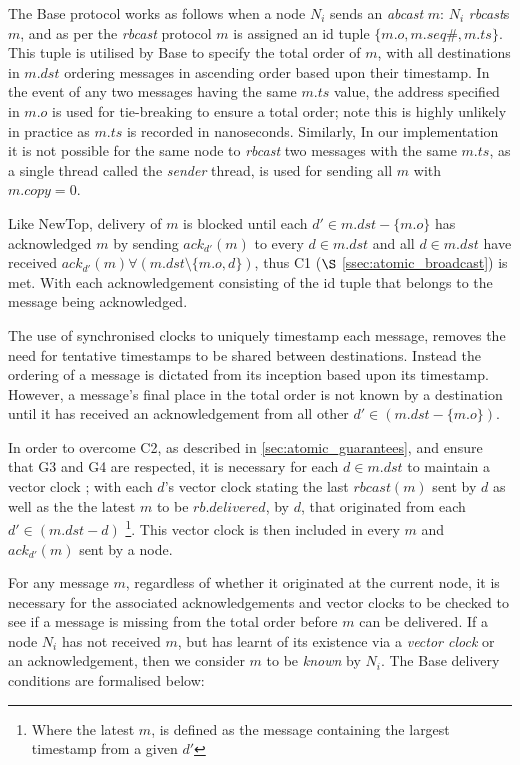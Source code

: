    The \textsf{Base} protocol works as follows when a node $N_i$ sends an \emph{abcast} $m$: $N_i$ \emph{rbcast}s $m$, and as per the \emph{rbcast} protocol $m$ is assigned an id tuple $\{m.o, m.seq\#, m.ts\}$.  This tuple is utilised by \textsf{Base} to specify the total order of $m$, with all destinations in $m.dst$ ordering messages in ascending order based upon their timestamp.  In the event of any two messages having the same $m.ts$ value, the address specified in $m.o$ is used for tie-breaking to ensure a total order; note this is highly unlikely in practice as $m.ts$ is recorded in nanoseconds.  Similarly, In our implementation it is not possible for the same node to \emph{rbcast} two messages with the same $m.ts$, as a single thread called the \emph{sender} thread, is used for sending all $m$ with $m.copy = 0$.  
    
    Like NewTop, delivery of $m$ is blocked until each $d' \in m.dst - \{m.o\}$ has acknowledged $m$ by sending $ack_{d'}(m)$ to every $d \in m.dst$ and all $d \in m.dst$ have received $ack_{d'}(m) \forall (m.dst \setminus \{m.o,d\})$, thus C1 ($\S$ \ref{ssec:atomic_broadcast}) is met.  With each acknowledgement consisting of the id tuple that belongs to the message being acknowledged.  
    
    The use of synchronised clocks to uniquely timestamp each message, removes the need for tentative timestamps to be shared between destinations.  Instead the ordering of a message is dictated from its inception based upon its timestamp.  However,  a message's final place in the total order is not known by a destination until it has received an acknowledgement from all other $d' \in (m.dst - \{m.o\})$.  
    
    In order to overcome C2, as described in \ref{sec:atomic_guarantees}, and ensure that G3 and G4 are respected, it is necessary for each $d \in m.dst$ to maintain a vector clock \citep{Mattern88virtualtime, fidge1988timestamps}; with each $d$'s vector clock stating the last $rbcast(m)$ sent by $d$ as well as the the latest $m$ to be $rb.delivered$, by $d$, that originated from each $d' \in (m.dst - d)$ \footnote{Where the latest $m$, is defined as the message containing the largest timestamp from a given $d'$}.  This vector clock is then included in every $m$ and $ack_{d'}(m)$ sent by a node.  
    
    For any message $m$, regardless of whether it originated at the current node, it is necessary for the associated acknowledgements and vector clocks to be checked to see if a message is missing from the total order before $m$ can be delivered.  If a node $N_i$ has not received $m$, but has learnt of its existence via a \emph{vector clock} or an acknowledgement, then we consider $m$ to be \emph{known} by $N_i$.  The \textsf{Base} delivery conditions are formalised below:
    
